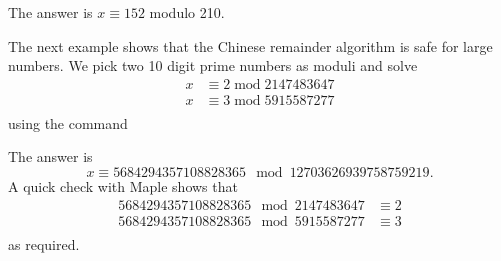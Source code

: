 
The answer is $x \equiv 152$ modulo 210.

\bigskip

The next example shows that the Chinese remainder algorithm is safe for large numbers.
We pick two 10 digit prime numbers as moduli and solve 
\begin{eqnarray*}
x & \equiv 2 \; \mbox{mod} \; 2147483647\\
x & \equiv 3 \; \mbox{mod} \; 5915587277\\
\end{eqnarray*}
using the command


The answer is 
$$
x \equiv 5684294357108828365 \mod 12703626939758759219.
$$
A quick check with Maple shows that 
\begin{eqnarray*}
5684294357108828365 \mod 2147483647 & \equiv 2 \\
5684294357108828365 \mod 5915587277 & \equiv 3 \\
\end{eqnarray*}
as required.



\bigskip


